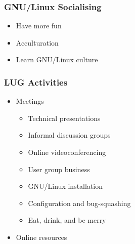 \documentclass{beamer}
\begin{document}
	\begin{frame}
		\frametitle{GNU/Linux Socialising}
		\begin{itemize}
			\pause
			\item Have more fun
			\pause
			\item Acculturation
			\pause
			\item Learn GNU/Linux culture
		\end{itemize}
	\end{frame}

	\begin{frame}
		\frametitle{LUG Activities}
		\begin{itemize}
			\pause
			\item Meetings
			\begin{itemize}
				\pause
				\item Technical presentations
				\pause
				\item Informal discussion groups
				\pause
				\item Online videoconferencing
				\pause
				\item User group business
				\pause
				\item GNU/Linux installation
				\pause
				\item Configuration and bug-squashing
				\pause
				\item Eat, drink, and be merry
			\end{itemize}
			\pause
			\item Online resources
		\end{itemize}
	\end{frame}
\end{document}
